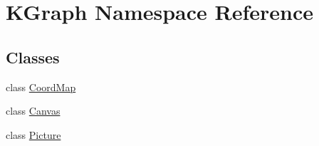 \hypertarget{namespace_k_graph}{\section{K\-Graph Namespace Reference}
\label{namespace_k_graph}
}
\subsection*{Classes}
\begin{DoxyCompactItemize}
\item 
class \hyperlink{class_k_graph_1_1_coord_map}{Coord\-Map}
\item 
class \hyperlink{class_k_graph_1_1_canvas}{Canvas}
\item 
class \hyperlink{class_k_graph_1_1_picture}{Picture}
\end{DoxyCompactItemize}
